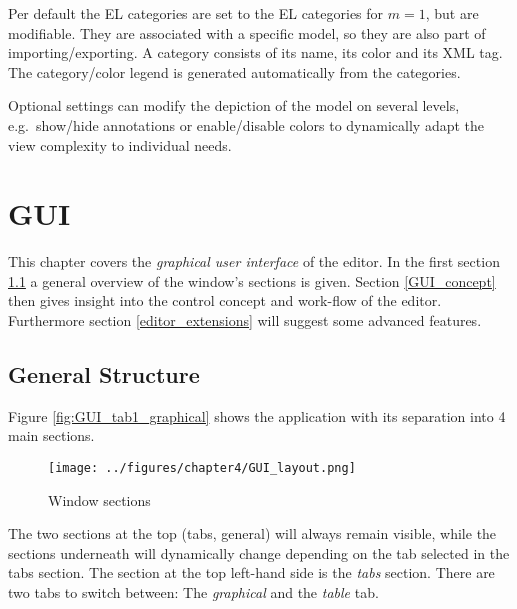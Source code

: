 \documentclass[twoside, openright, 12pt]{book}
\begin{document}
Per default the EL categories are set to the EL categories for $m=1$, but are modifiable.
They are associated with a specific model, so they are also part of importing/exporting.
A category consists of its name, its color and its XML tag.
The category/color legend is generated automatically from the categories.

Optional settings can modify the depiction of the model on several levels, e.g.\ show/hide annotations or enable/disable colors to dynamically adapt the view complexity to individual needs.



\section{GUI}
\label{editor_gui}
This chapter covers the \textit{graphical user interface} of the editor.
In the first section \ref{editor_structure} a general overview of the window's sections is given.
Section \ref{GUI_concept} then gives insight into the control concept and work-flow of the editor.
Furthermore section \ref{editor_extensions} will suggest some advanced features.



\subsection{General Structure}
\label{editor_structure}
Figure \ref{fig:GUI_tab1_graphical} shows the application with its separation into 4 main sections.

\begin{figure}[htb]
	\centering
	\texttt{[image: ../figures/chapter4/GUI\_layout.png]}
	\caption{Window sections}
	\label{fig:GUI_layout}
\end{figure}

\noindent
The two sections at the top (tabs, general) will always remain visible, while the sections underneath will dynamically change depending on the tab selected in the tabs section.
The section at the top left-hand side is the \textit{tabs} section.
There are two tabs to switch between: The \textit{graphical} and the \textit{table} tab.
\end{document}
